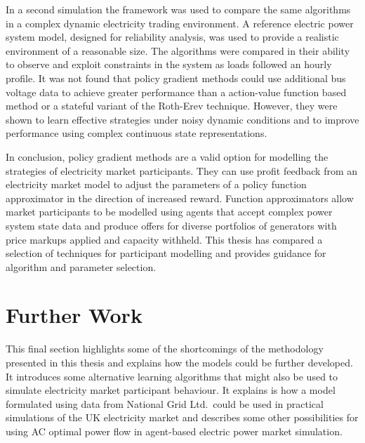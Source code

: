 In a second simulation the framework was used to compare the same algorithms in
a complex dynamic electricity trading environment.  A reference electric power
system model, designed for reliability analysis, was used to provide a
realistic environment of a reasonable size.  The algorithms were compared in
their ability to observe and exploit constraints in the system as loads followed
an hourly profile.  It was not found that policy gradient methods could use
additional bus voltage data to achieve greater performance than a action-value
function based method or a stateful variant of the Roth-Erev technique.
However, they were shown to learn effective strategies under noisy dynamic
conditions and to improve performance using complex continuous state
representations.

In conclusion, policy gradient methods are a valid option for modelling the
strategies of electricity market participants.  They can use profit feedback
from an electricity market model to adjust the parameters of a policy function
approximator in the direction of increased reward.  Function approximators allow
market participants to be modelled using agents that accept complex power system
state data and produce offers for diverse portfolios of generators with
price markups applied and capacity withheld.  This thesis has compared
a selection of techniques for participant modelling and provides guidance for
algorithm and parameter selection.

\section{Further Work}
\label{sec:furtherwork}
This final section highlights some of the shortcomings of the methodology
presented in this thesis and explains how the models could be further
developed. It introduces some alternative learning algorithms that might also be used to
simulate electricity market participant behaviour.
It explains is how a model formulated using data from National Grid
Ltd.~could be used in practical simulations of the UK electricity market and
describes some other possibilities for using AC optimal power flow in
agent-based electric power market simulation.

